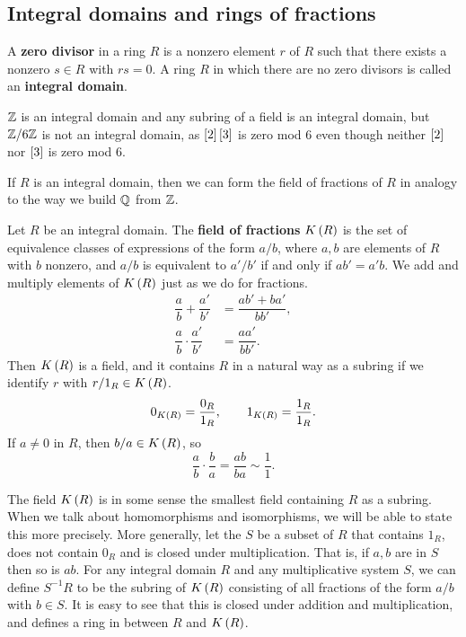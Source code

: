 
\subsection{Integral domains and rings of fractions}

\begin{definition}
A \textbf{zero divisor} in a ring $ R $ is a nonzero element $ r $ of $ R $ such that there exists a nonzero $ s \in R $ with $ rs = 0 $. A ring $ R $ in which there are no zero divisors is called an \textbf{integral domain}.
\end{definition}

\begin{example2}
$ \Z $ is an integral domain and any subring of a field is an integral domain, but $ \Z / 6\Z $ is not an integral domain, as $ \sb{2}\sb{3} $ is zero mod $ 6 $ even though neither $ \sb{2} $ nor $ \sb{3} $ is zero mod $ 6 $.
\end{example2}

If $ R $ is an integral domain, then we can form the field of fractions of $ R $ in analogy to the way we build $ \Q $ from $ \Z $.

\begin{definition}
Let $ R $ be an integral domain. The \textbf{field of fractions} $ K\rb{R} $ is the set of equivalence classes of expressions of the form $ a / b $, where $ a, b $ are elements of $ R $ with $ b $ nonzero, and $ a / b $ is equivalent to $ a' / b' $ if and only if $ ab' = a'b $. We add and multiply elements of $ K\rb{R} $ just as we do for fractions.
\begin{align*}
\dfrac{a}{b} + \dfrac{a'}{b'} & = \dfrac{ab' + ba'}{bb'}, \\
\dfrac{a}{b} \cdot \dfrac{a'}{b'} & = \dfrac{aa'}{bb'}.
\end{align*}
Then $ K\rb{R} $ is a field, and it contains $ R $ in a natural way as a subring if we identify $ r $ with $ r / 1_R \in K\rb{R} $.
$$ 0_{K\rb{R}} = \dfrac{0_R}{1_R}, \qquad 1_{K\rb{R}} = \dfrac{1_R}{1_R}. $$
If $ a \ne 0 $ in $ R $, then $ b / a \in K\rb{R} $, so
$$ \dfrac{a}{b} \cdot \dfrac{b}{a} = \dfrac{ab}{ba} \sim \dfrac{1}{1}. $$
\end{definition}

The field $ K\rb{R} $ is in some sense the smallest field containing $ R $ as a subring. When we talk about homomorphisms and isomorphisms, we will be able to state this more precisely. More generally, let the  $ S $ be a subset of $ R $ that contains $ 1_R $, does not contain $ 0_R $ and is closed under multiplication. That is, if $ a, b $ are in $ S $ then so is $ ab $. For any integral domain $ R $ and any multiplicative system $ S $, we can define $ S^{-1}R $ to be the subring of $ K\rb{R} $ consisting of all fractions of the form $ a / b $ with $ b \in S $. It is easy to see that this is closed under addition and multiplication, and defines a ring in between $ R $ and $ K\rb{R} $.


